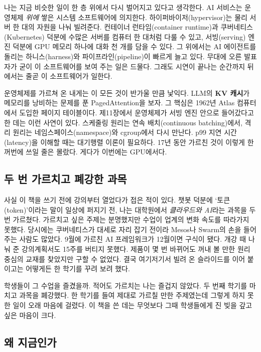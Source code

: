나는 지금 비슷한 일이 한 층 위에서 다시 벌어지고 있다고 생각한다. AI 서비스는 운영체제 \textit{위에} 쌓은 시스템 소프트웨어에 의지한다. 하이퍼바이저(hypervisor)는 물리 서버 한 대의 자원을 나눠 빌려준다. 컨테이너 런타임(container runtime)과 쿠버네티스(Kubernetes) 덕분에 수많은 서버를 컴퓨터 한 대처럼 다룰 수 있고, 서빙(serving) 엔진 덕분에 GPU 메모리 하나에 대화 천 개를 담을 수 있다. 그 위에서는 AI 에이전트를 돌리는 하니스(harness)와 파이프라인(pipeline)이 빠르게 늘고 있다. 무대에 오른 발표자가 굳이 이 소프트웨어를 보여 주는 일은 드물다. 그래도 시연이 끝나는 순간까지 뒤에서는 줄곧 이 소프트웨어가 일한다.

운영체제를 가르쳐 온 내게는 이 모든 것이 반가울 만큼 낯익다. LLM의 \textbf{KV 캐시}가 메모리를 낭비하는 문제를 푼 PagedAttention을 보자. 그 핵심은 1962년 Atlas 컴퓨터에서 도입한 페이지 테이블이다. 제11장에서 운영체제가 서빙 엔진 안으로 들어갔다고 한 데는 이런 사연이 있다. 스케줄링 원리는 연속 배치(continuous batching)에서, 격리 원리는 네임스페이스(namespace)와 cgroup에서 다시 만난다. p99 지연 시간(latency)을 이해할 때는 대기행렬 이론이 필요하다. 17년 동안 가르친 것이 이렇게 한꺼번에 쓰일 줄은 몰랐다. 게다가 이번에는 GPU에서다.

\subsection*{두 번 가르치고 폐강한 과목}

사실 이 책을 쓰기 전에 강의부터 열었다가 접은 적이 있다. 챗봇 덕분에 ‘토큰(token)’이라는 말이 일상에 퍼지기 전, 나는 대학원에서 \textit{클라우드와 AI}라는 과목을 두 번 가르쳤다. 가르치고 싶은 주제는 분명했지만 수업이 업계의 변화 속도를 따라가지 못했다. 당시에는 쿠버네티스가 대세로 자리 잡기 전이라 Mesos나 Swarm의 손을 들어 주는 사람도 많았다. 9월에 가르친 AI 프레임워크가 12월이면 구식이 됐다. 개강 때 나눠 준 강의계획서도 15주를 버티지 못했다. 제품이 몇 번 바뀌어도 꺼내 볼 만한 원리 중심의 교재를 찾았지만 구할 수 없었다. 결국 여기저기서 빌려 온 슬라이드를 이어 붙이고는 어떻게든 한 학기를 꾸려 보려 했다.

학생들이 그 수업을 즐겼을까. 적어도 가르치는 나는 즐겁지 않았다. 두 번째 학기를 마치고 과목을 폐강했다. 한 학기를 들여 제대로 가르칠 만한 주제였는데 그렇게 하지 못한 일이 오래 마음에 걸렸다. 이 책을 쓴 데는 무엇보다 그때 학생들에게 진 빚을 갚고 싶은 마음이 크다.

\subsection*{왜 지금인가}

